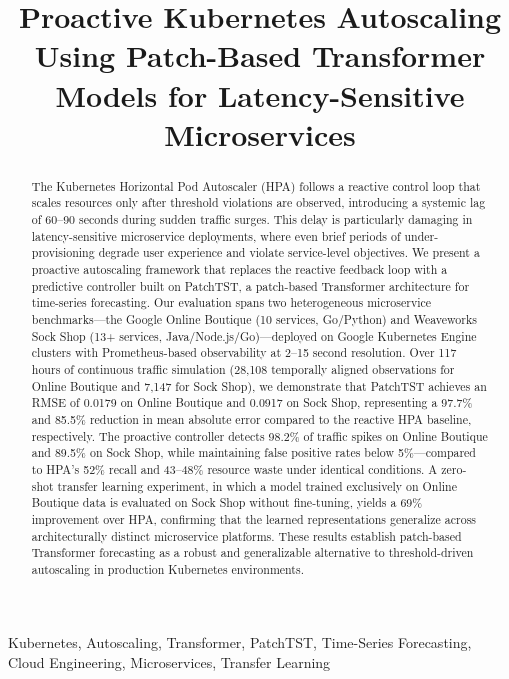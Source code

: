 \documentclass[conference]{IEEEtran}
\begin{document}
\title{Proactive Kubernetes Autoscaling Using Patch-Based Transformer Models for Latency-Sensitive Microservices}

\author{
}

\maketitle

\begin{abstract}
The Kubernetes Horizontal Pod Autoscaler (HPA) follows a reactive control loop that scales resources only after threshold violations are observed, introducing a systemic lag of 60--90 seconds during sudden traffic surges. This delay is particularly damaging in latency-sensitive microservice deployments, where even brief periods of under-provisioning degrade user experience and violate service-level objectives. We present a proactive autoscaling framework that replaces the reactive feedback loop with a predictive controller built on PatchTST, a patch-based Transformer architecture for time-series forecasting. Our evaluation spans two heterogeneous microservice benchmarks---the Google Online Boutique (10 services, Go/Python) and Weaveworks Sock Shop (13+ services, Java/Node.js/Go)---deployed on Google Kubernetes Engine clusters with Prometheus-based observability at 2--15 second resolution. Over 117 hours of continuous traffic simulation (28,108 temporally aligned observations for Online Boutique and 7,147 for Sock Shop), we demonstrate that PatchTST achieves an RMSE of 0.0179 on Online Boutique and 0.0917 on Sock Shop, representing a 97.7\% and 85.5\% reduction in mean absolute error compared to the reactive HPA baseline, respectively. The proactive controller detects 98.2\% of traffic spikes on Online Boutique and 89.5\% on Sock Shop, while maintaining false positive rates below 5\%---compared to HPA's 52\% recall and 43--48\% resource waste under identical conditions. A zero-shot transfer learning experiment, in which a model trained exclusively on Online Boutique data is evaluated on Sock Shop without fine-tuning, yields a 69\% improvement over HPA, confirming that the learned representations generalize across architecturally distinct microservice platforms. These results establish patch-based Transformer forecasting as a robust and generalizable alternative to threshold-driven autoscaling in production Kubernetes environments.
\end{abstract}

\begin{IEEEkeywords}
Kubernetes, Autoscaling, Transformer, PatchTST, Time-Series Forecasting, Cloud Engineering, Microservices, Transfer Learning
\end{IEEEkeywords}
\end{document}
